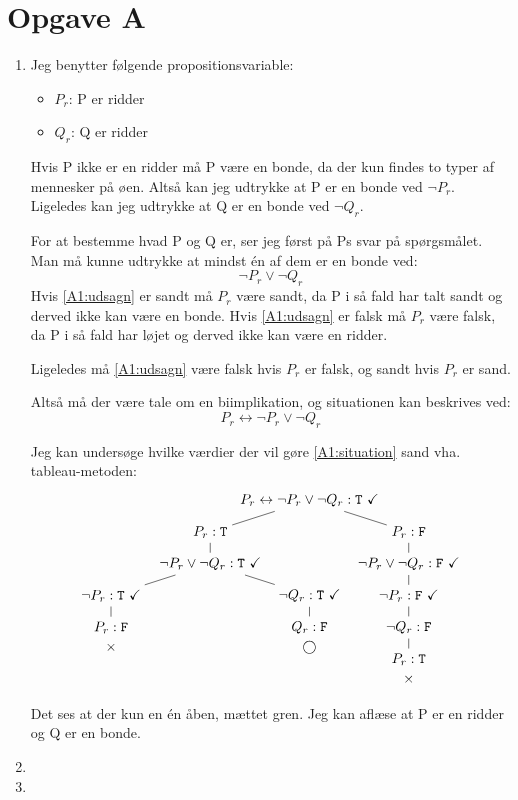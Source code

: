 \section*{Opgave A}
\begin{enumerate}
  \item
  Jeg benytter følgende propositionsvariable:
  \begin{itemize}
    \item $P_r$: P er ridder
    \item $Q_r$: Q er ridder
  \end{itemize}
  Hvis P ikke er en ridder må P være en bonde, da der kun findes to typer af mennesker på øen. Altså kan jeg udtrykke at P er en bonde ved $\lnot P_r$. Ligeledes kan jeg udtrykke at Q er en bonde ved $\lnot Q_r$.

  For at bestemme hvad P og Q er, ser jeg først på Ps svar på spørgsmålet. Man må kunne udtrykke at mindst én af dem er en bonde ved:
  \begin{equation}
    \label{A1:udsagn}
    \lnot P_r \lor \lnot Q_r
  \end{equation}
  Hvis \eqref{A1:udsagn} er sandt må $P_r$ være sandt, da P i så fald har talt sandt og derved ikke kan være en bonde. Hvis \eqref{A1:udsagn} er falsk må $P_r$ være falsk, da P i så fald har løjet og derved ikke kan være en ridder.

  Ligeledes må \eqref{A1:udsagn} være falsk hvis $P_r$ er falsk, og sandt hvis $P_r$ er sand.

  Altså må der være tale om en biimplikation, og situationen kan beskrives ved:
  \begin{equation}
    \label{A1:situation}
    P_r \leftrightarrow \lnot P_r \lor \lnot Q_r
  \end{equation}

  Jeg kan undersøge hvilke værdier der vil gøre \eqref{A1:situation} sand vha. tableau-metoden:
  \begin{equation*}
    \begin{tikzpicture}[level distance=8mm,sibling distance=50mm]
      \node {$P_r \leftrightarrow \lnot P_r \lor \lnot Q_r : \T\ \checkmark$}
      child {
        node {$P_r : \T$}
        child {
          node {$\lnot P_r \lor \lnot Q_r : \T\ \checkmark$}
          child {
            node {$\lnot P_r : \T\ \checkmark$}
            child {
              node {$P_r : \F$}
              \closed
            }
          }
          child {
            node {$\lnot Q_r : \T\ \checkmark$}
            child {
              node {$Q_r : \F$}
              \open
            }
          }
        }
      }
      child {
        node {$P_r : \F$}
        child {
          node {$\lnot P_r \lor \lnot Q_r : \F\ \checkmark$}
          child {
            node {$\lnot P_r : \F\ \checkmark$}
            child {
              node {$\lnot Q_r : \F$}
              child {
                node {$P_r : \T$}
                \closed
              }
            }
          }
        }
      };
    \end{tikzpicture}
  \end{equation*}

  Det ses at der kun en én åben, mættet gren. Jeg kan aflæse at P er en ridder og Q er en bonde.

  \item
  \item
\end{enumerate}
